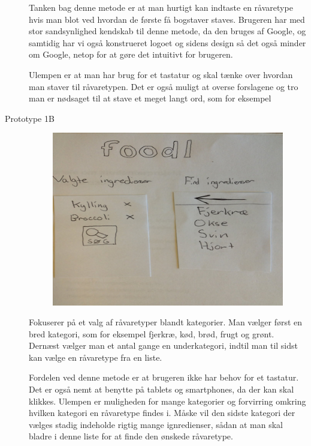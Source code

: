 \begin{description}
Tanken bag denne metode er at man hurtigt kan indtaste en råvaretype hvis man blot ved hvordan de første få bogstaver staves. Brugeren har med stor sandsynlighed kendskab til denne metode, da den bruges af Google, og samtidig har vi også konstrueret logoet og sidens design så det også minder om Google, netop for at gøre det intuitivt for brugeren.

Ulempen er at man har brug for et tastatur og skal tænke over hvordan man staver til råvaretypen. Det er også muligt at overse forslagene og tro man er nødsaget til at stave et meget langt ord, som for eksempel 

\item[Prototype 1B]

\begin{figure}[H]
\centering
\includegraphics[scale=0.7]{billeder/prototyper/prototype1b.png}
\label{fig:prototype1b}
\end{figure}

Fokuserer på et valg af råvaretyper blandt kategorier. Man vælger først en bred kategori, som for eksempel fjerkræ, kød, brød, frugt og grønt. Dernæst vælger man et antal gange en underkategori, indtil man til sidst kan vælge en råvaretype fra en liste.

Fordelen ved denne metode er at brugeren ikke har behov for et tastatur. Det er også nemt at benytte på tablets og smartphones, da der kan skal klikkes. Ulempen er muligheden for mange kategorier og forvirring omkring hvilken kategori en råvaretype findes i. Måske vil den sidste kategori der vælges stadig indeholde rigtig mange ignredienser, sådan at man skal bladre i denne liste for at finde den ønskede råvaretype. 


\end{description}
